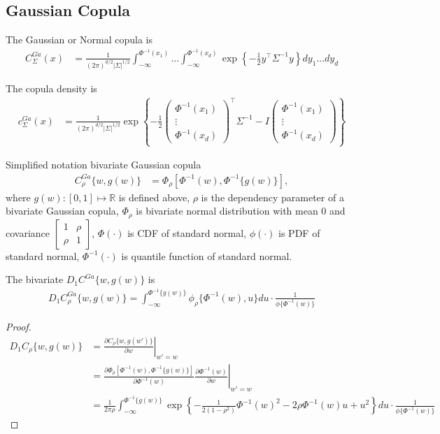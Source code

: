 \subsection{Gaussian Copula}\label{subsec:Gaussian-copula}
The Gaussian or Normal copula is
\begin{align}
    C^{Ga}_\Sigma(x) &= \frac{1}{(2\pi)^{d/2} |\Sigma|^{1/2}}
    \int_{-\infty}^{\Phi^{-1}(x_1)} \dots \int_{-\infty}^{\Phi^{-1}(x_d)}
    \exp \left\{
    -\frac{1}{2}y^\top \Sigma^{-1}y
    \right\}
    dy_1 \dots dy_d
    \end{align}

The copula density is
\begin{align}
    c^{Ga}_\Sigma(x) &= \frac{1}{(2\pi)^{d/2} |\Sigma|^{1/2}}
    \exp \left\{
    -\frac{1}{2}\begin{pmatrix} \Phi^{-1}(x_1) \\ \vdots \\ \Phi^{-1}(x_d) \end{pmatrix}^\top \Sigma^{-1}-I \begin{pmatrix} \Phi^{-1}(x_1) \\ \vdots \\ \Phi^{-1}(x_d) \end{pmatrix}
    \right\}
    \end{align}

Simplified notation bivariate Gaussian copula
\begin{align}
       C^{Ga}_\rho \{w, g(w)\} &= \Phi_\rho [\Phi^{-1}(w), \Phi^{-1}\{g(w)\}],
\end{align}
where $g(w): [0,1] \mapsto \mathbb{R}$ is defined above,
$\rho$ is the dependency parameter of a bivariate Gaussian copula,
$\Phi_\rho$ is bivariate normal distribution with mean 0 and covariance $\begin{bmatrix}1 & \rho \\ \rho & 1 \end{bmatrix}$,
$\Phi(\cdot)$ is CDF of standard normal,
$\phi(\cdot)$ is PDF of standard normal,
$\Phi^{-1}(\cdot)$ is quantile function of standard normal.

The bivariate $D_1 C^{Ga}\{w, g(w)\}$ is
\begin{align}
    D_1 C^{Ga}_\rho\{w, g(w)\} = \int_{-\infty}^{\Phi^{-1}\{g(w)\}} \phi_\rho\{
    \Phi^{-1}(w), u \}du \cdot \frac{1}{\phi\{\Phi^{-1}(w)\}}
    \end{align}
\begin{proof}
    \begin{align}
    D_1 C_\rho\{w, g(w)\}
    &= \left. \frac{\partial C_\rho\{w, g(w')\}}{\partial w}\right|_{w'=w}\\
    &= \left. \frac{\partial \Phi_\rho [\Phi^{-1}(w), \Phi^{-1}\{g(w)\}]}{\partial \Phi^{-1}(w)} \frac{\partial \Phi^{-1}(w)}{\partial w}\right|_{w'=w}\\
    &= \frac{1}{2\pi\rho} \int_{-\infty}^{\Phi^{-1}\{g(w)\}} \exp\left\{
        -\frac{1}{2(1-\rho^2)} \Phi^{-1}(w)^2 - 2\rho\Phi^{-1}(w)u + u^2
        \right\}du
        \cdot \frac{1}{\phi\{\Phi^{-1}(w)\}}
        \end{align}
    \end{proof}

